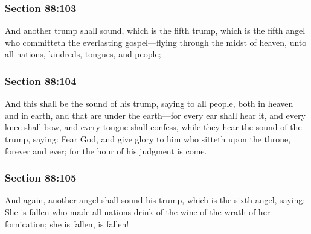 	\subsubsection{Section 88:103} %
		\label{DC88-103}

		And another trump shall sound, which is the fifth trump, which is the fifth angel who committeth the everlasting gospel---flying through the midst of heaven, unto all nations, kindreds, tongues, and people;


	\subsubsection{Section 88:104} %
		\label{DC88-104}

		And this shall be the sound of his trump, saying to all people, both in heaven and in earth, and that are under the earth---for every ear shall hear it, and every knee shall bow, and every tongue shall confess, while they hear the sound of the trump, saying: Fear God, and give glory to him who sitteth upon the throne, forever and ever; for the hour of his judgment is come.


	\subsubsection{Section 88:105} %
		\label{DC88-105}

		And again, another angel shall sound his trump, which is the sixth angel, saying: She is fallen who made all nations drink of the wine of the wrath of her fornication; she is fallen, is fallen!

